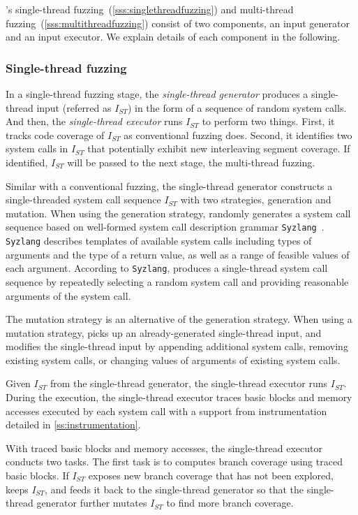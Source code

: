 \sys's single-thread fuzzing~(\autoref{sss:singlethreadfuzzing}) and
multi-thread fuzzing~(\autoref{sss:multithreadfuzzing}) consist of two
components, an input generator and an input executor. We explain
details of each component in the following.


\subsubsection{Single-thread fuzzing}
\label{sss:singlethreadfuzzing}
%
In a single-thread fuzzing stage, the \textit{single-thread generator}
produces a single-thread input (referred as $I_{ST}$) in the form of a
sequence of random system calls.
%
And then, the \textit{single-thread executor} runs $I_{ST}$ to perform
two things.
%
First, it tracks code coverage of $I_{ST}$ as conventional fuzzing
does. Second, it identifies two system calls in $I_{ST}$ that
potentially exhibit new interleaving segment coverage.  If identified,
$I_{ST}$ will be passed to the next stage, the multi-thread fuzzing.


%
Similar with a conventional fuzzing, the single-thread generator
constructs a single-threaded system call sequence $I_{ST}$ with two
strategies, generation and mutation.
%
When using the generation strategy, \sys randomly generates a system
call sequence based on well-formed system call description grammar
\texttt{Syzlang}~\cite{syzlang}.
%
\texttt{Syzlang} describes templates of available system calls
including types of arguments and the type of a return value, as well
as a range of feasible values of each argument.
%
According to \texttt{Syzlang}, \sys produces a single-thread system
call sequence by repeatedly selecting a random system call and
providing reasonable arguments of the system call.

The mutation strategy is an alternative of the generation strategy.
When using a mutation strategy, \sys picks up an already-generated
single-thread input, and modifies the single-thread input by appending
additional system calls, removing existing system calls, or changing
values of arguments of existing system calls.


%
Given $I_{ST}$ from the single-thread generator, the single-thread
executor runs $I_{ST}$.
%
During the execution, the single-thread executor traces basic blocks
and memory accesses executed by each system call with a support from
instrumentation detailed in \autoref{ss:instrumentation}.

With traced basic blocks and memory accesses, the single-thread
executor conducts two tasks.
%
The first task is to computes branch coverage using traced basic
blocks.
%
If $I_{ST}$ exposes new branch coverage that has not been explored,
\sys keeps $I_{ST}$, and feeds it back to the single-thread generator
so that the single-thread generator further mutates $I_{ST}$ to find
more branch coverage.


